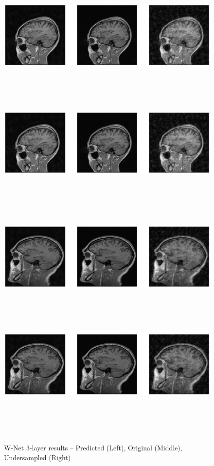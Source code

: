 \vspace*{0.5cm}
\begin{figure}[!htbp]
  \begin{center}
    \leavevmode
    \ifpdf
      \includegraphics[height=1.5in]{Chapter4/images/res3.png}
    \else
      \includegraphics[bb = 92 86 545 742, height=3in]{Chapter4/images/res3.png}
    \fi
  \end{center}

  \begin{center}
    \leavevmode
    \ifpdf
      \includegraphics[height=1.5in]{Chapter4/images/res4.png}
    \else
      \includegraphics[bb = 92 86 545 742, height=3in]{Chapter4/images/res4.png}
    \fi
    \caption{W-Net 3-layer results -- Predicted (Left), Original (Middle), Undersampled (Right)}
    \label{Result W-Net 3-layer}
  \end{center}
\end{figure}

